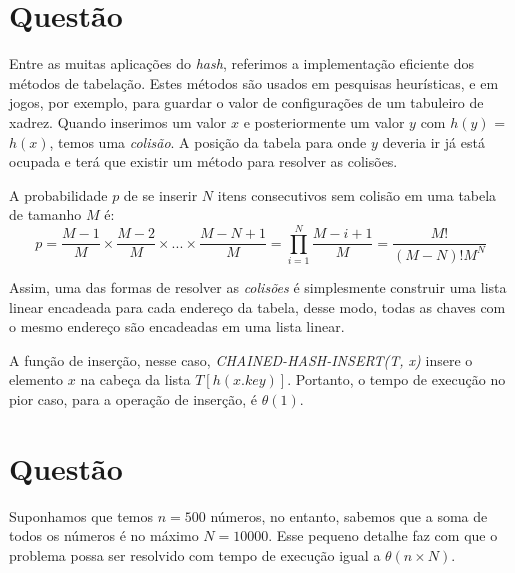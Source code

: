 \documentclass[a4paper,12pt]{article}
\begin{document}
\section{Questão}
Entre as muitas aplicações do \textit{hash}, referimos a implementação eficiente dos métodos de tabelação. Estes métodos são usados em pesquisas heurísticas, e em jogos, por exemplo, para guardar o valor de configurações de um tabuleiro de xadrez.
Quando inserimos um valor $x$ e posteriormente um valor $y$ com $h(y)$ = $h(x)$, temos uma \textit{colisão}. A posição da tabela para onde $y$ deveria ir já está ocupada e terá que existir um método para resolver as colisões.

A probabilidade $p$ de se inserir $N$ itens consecutivos sem colisão em uma tabela de tamanho $M$ é:
	$$
	p = \frac{M-1}{M}\times\frac{M-2}{M}\times...\times\frac{M-N+1}{M} = \prod \limits_{i=1}^N \frac{M-i+1}{M} = \frac{M!}{(M-N)!M^N}
	$$

Assim, uma das formas de resolver as \textit{colisões} é simplesmente construir uma lista linear encadeada para cada endereço da tabela, desse modo, todas as chaves com o mesmo endereço são encadeadas em uma lista linear.

A função de inserção, nesse caso, \textit{CHAINED-HASH-INSERT(T, x)} insere o elemento $x$ na cabeça da lista $T[h(x.key)]$. Portanto, o tempo de execução no pior caso, para a operação de inserção, é $\theta(1)$.

\section{Questão}


Suponhamos que temos $n = 500$ números, no entanto, sabemos que a soma de todos os números é no máximo $N = 10000$. Esse pequeno detalhe faz com que o problema possa ser resolvido com tempo de execução igual a $\theta(n\times N)$.
\end{document}
